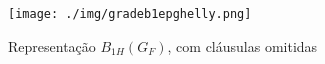 \begin{figure}[htb]	
\center%
\texttt{[image: ./img/gradeb1epghelly.png]}
\caption{Representa\c{c}\~ao $B_{1H}(G_{F})$, com cláusulas omitidas}
\label{fig:gradeb1epg}
\end{figure}